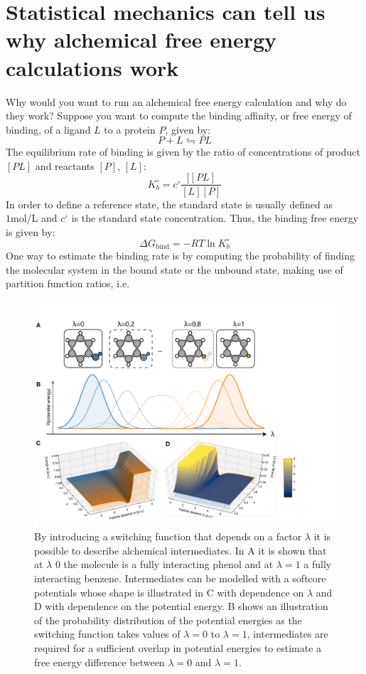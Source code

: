 \documentclass[9pt,bestpractices]{livecoms}
\begin{document}
\section{Statistical mechanics can tell us why alchemical free energy calculations work}
\label{sec:theory}
Why would you want to run an alchemical free energy calculation and why do they work? Suppose you want to compute the binding affinity, or free energy of binding, of a ligand $L$ to a protein $P$, given by:
\begin{equation}
P+L\leftrightharpoons PL
\end{equation}
The equilibrium rate of binding is given by the ratio of concentrations of product $[PL]$ and reactants $[P]$, $[L]$:
\begin{equation}
 K_b^{\circ} = c^{\circ}\frac{[[PL]}{[L][P]}
\end{equation}
In order to define a reference state, the standard state is usually defined as $1 \mathrm{mol}/\mathrm{L}$ and $c^\circ$ is the standard state concentration. Thus, the binding free energy is given by:
\begin{equation}
    \Delta G_{\mathrm{bind}} = -RT\ln K_b^{\circ}
\end{equation}
One way to estimate the binding rate is by computing the probability of finding the molecular system in the bound state or the unbound state, making use of partition function ratios, i.e. 
\begin{figure}
    \includegraphics[width=0.95\linewidth]{paper/figures/fig2_what_is_lam/Fig2.pdf}
    \caption{By introducing a switching function that depends on a factor $\lambda$ it is possible to describe alchemical intermediates. In A it is shown that at $\lambda$ 0 the molecule is a fully interacting phenol and at $\lambda=1$ a fully interacting benzene. Intermediates can be modelled with a softcore potentials whose shape is illustrated in C with dependence on $\lambda$ and D with dependence on the potential energy. B shows an illustration of the probability distribution of the potential energies as the switching function takes values of $\lambda=0$ to $\lambda=1$, intermediates are required for a sufficient overlap in potential energies to estimate a free energy difference between $\lambda=0$ and $\lambda=1$. }
    \label{fig:fig2_what_is_lambda}
\end{figure}
\end{document}
